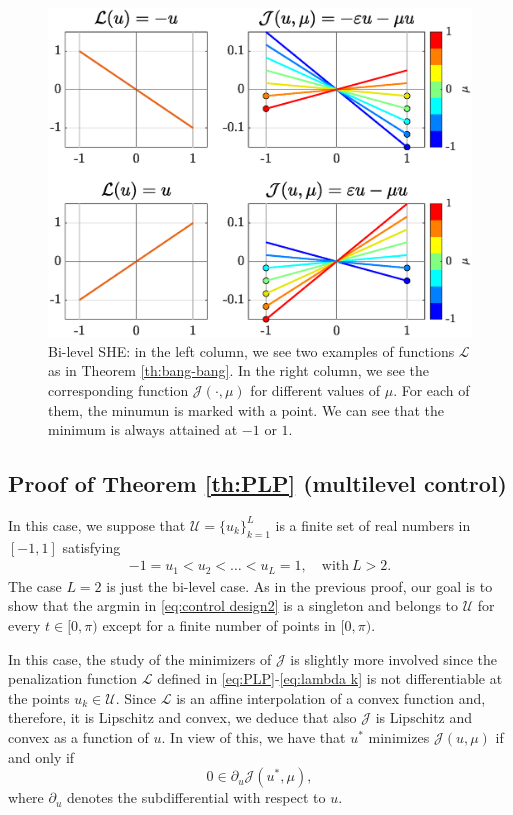 \documentclass[twocolumn]{autart}    %
\begin{document}
\begin{figure}[h] 
	\centering
	\includegraphics[scale=0.35]{img/fig03.eps}
	\caption{Bi-level SHE: in the left column, we see two examples of functions $\mathcal{L}$ as in Theorem \ref{th:bang-bang}. In the right column, we see the corresponding function $\mathcal{J}(\cdot,\mu)$ for different values of $\mu$. For each of them, the minumun is marked with a point.  We can see that the minimum is always attained at $-1$ or $1$.}\label{fig:Bang-Bang-penalization} 
\end{figure}

\subsection{Proof of Theorem \ref{th:PLP} (multilevel control)}\label{sec: proof:PLP}

In this case, we suppose that $\mathcal{U} = \{ u_k\}_{k=1}^L$ is a finite set of real numbers in $[-1,1]$ satisfying
\begin{align}\label{eq:order} 
	-1 = u_1 < u_2 <\ldots <u_L = 1, \quad \text{with} \ L> 2.
\end{align} 
The case $L=2$ is just the bi-level case. As in the previous proof, our goal is to show that the argmin in \eqref{eq:control design2} is a singleton and belongs to $\mathcal{U}$ for every $t\in [0,\pi)$ except for a finite number of points in $[0,\pi)$.

In this case, the study of the minimizers of $\mathcal{J}$ is slightly more involved since the penalization function $\mathcal{L}$ defined in \eqref{eq:PLP}-\eqref{eq:lambda k} is not differentiable at the points $u_k\in\mathcal U$. Since $\mathcal{L}$ is an affine interpolation of a convex function and, therefore, it is Lipschitz and convex, we deduce that also $\mathcal{J}$ is Lipschitz and convex as a function of $u$. In view of this, we have that $u^\ast$ minimizes $\mathcal{J} (u,\mu)$ if and only if
\begin{equation}\label{opti cond subdiff}
	0\in \partial_u \mathcal{J} (u^\ast,\mu),
\end{equation}
where $\partial_u$ denotes the subdifferential with respect to $u$. 
\end{document}
